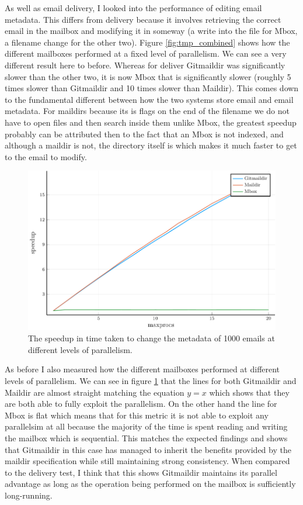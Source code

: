 As well as email delivery, I looked into the performance of editing email metadata. This differs from delivery because it involves retrieving the correct email in the mailbox and modifying it in someway (a write into the file for Mbox, a filename change for the other two). Figure \ref{fig:tmp_combined} shows how the different mailboxes performed at a fixed level of parallelism. We can see a very different result here to before. Whereas for deliver Gitmaildir was significantly slower than the other two, it is now Mbox that is significantly slower (roughly 5 times slower than Gitmaildir and 10 times slower than Maildir). This comes down to the fundamental different between how the two systems store email and email metadata. For maildirs because its is flags on the end of the filename we do not have to open files and then search inside them unlike Mbox, the greatest speedup probably can be attributed then to the fact that an Mbox is not indexed, and although a maildir is not, the directory itself is which makes it much faster to get to the email to modify.

\begin{figure}[h]
    \centering
    \includegraphics{figs/tmpp_speedup_combined}
    \caption{The speedup in time taken to change the metadata of 1000 emails at different levels of parallelism.}
    \label{fig:tmpp_speedup_combined}
\end{figure}

As before I also measured how the different mailboxes performed at different levels of parallelism. We can see in figure \ref{fig:tmpp_speedup_combined} that the lines for both Gitmaildir and Maildir are almost straight matching the equation $y=x$ which shows that they are both able to fully exploit the parallelism. On the other hand the line for Mbox is flat which means that for this metric it is not able to exploit any parallelsim at all because the majority of the time is spent reading and writing the mailbox which is sequential. This matches the expected findings and shows that Gitmaildir in this case has managed to inherit the benefits provided by the maildir specification while still maintaining strong consistency. When compared to the delivery test, I think that this shows Gitmaildir maintains its parallel advantage as long as the operation being performed on the mailbox is sufficiently long-running.

